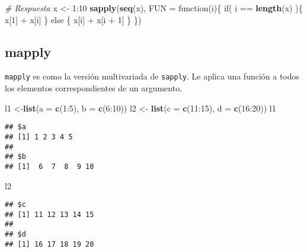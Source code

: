 \documentclass[]{article}
\newenvironment{Shaded}{\begin{snugshade}}{\end{snugshade}}
\newcommand{\KeywordTok}[1]{\textcolor[rgb]{0.13,0.29,0.53}{\textbf{{#1}}}}
\newcommand{\DataTypeTok}[1]{\textcolor[rgb]{0.13,0.29,0.53}{{#1}}}
\newcommand{\DecValTok}[1]{\textcolor[rgb]{0.00,0.00,0.81}{{#1}}}
\newcommand{\StringTok}[1]{\textcolor[rgb]{0.31,0.60,0.02}{{#1}}}
\newcommand{\CommentTok}[1]{\textcolor[rgb]{0.56,0.35,0.01}{\textit{{#1}}}}
\newcommand{\NormalTok}[1]{{#1}}
\begin{document}
\begin{Shaded}
\begin{Highlighting}[]
\CommentTok{# Respuesta}
\NormalTok{x <-}\StringTok{ }\DecValTok{1}\NormalTok{:}\DecValTok{10}
\KeywordTok{sapply}\NormalTok{(}\KeywordTok{seq}\NormalTok{(x), }\DataTypeTok{FUN =} \NormalTok{function(i)\{}
  \NormalTok{if( i ==}\StringTok{ }\KeywordTok{length}\NormalTok{(x) )\{}
    \NormalTok{x[}\DecValTok{1}\NormalTok{] +}\StringTok{ }\NormalTok{x[i]}
  \NormalTok{\} else \{}
    \NormalTok{x[i] +}\StringTok{ }\NormalTok{x[i +}\StringTok{ }\DecValTok{1}\NormalTok{]}
  \NormalTok{\}}
\NormalTok{\})}
\end{Highlighting}
\end{Shaded}

\subsection{mapply}\label{mapply}

\texttt{mapply} es como la versión multivariada de \texttt{sapply}. Le
aplica una función a todos los elementos correspondientes de un
argumento.

\begin{Shaded}
\begin{Highlighting}[]
\NormalTok{l1 <-}\KeywordTok{list}\NormalTok{(}\DataTypeTok{a =} \KeywordTok{c}\NormalTok{(}\DecValTok{1}\NormalTok{:}\DecValTok{5}\NormalTok{), }\DataTypeTok{b =} \KeywordTok{c}\NormalTok{(}\DecValTok{6}\NormalTok{:}\DecValTok{10}\NormalTok{))}
\NormalTok{l2 <-}\StringTok{ }\KeywordTok{list}\NormalTok{(}\DataTypeTok{c =} \KeywordTok{c}\NormalTok{(}\DecValTok{11}\NormalTok{:}\DecValTok{15}\NormalTok{), }\DataTypeTok{d =} \KeywordTok{c}\NormalTok{(}\DecValTok{16}\NormalTok{:}\DecValTok{20}\NormalTok{))}
\NormalTok{l1}
\end{Highlighting}
\end{Shaded}

\begin{verbatim}
## $a
## [1] 1 2 3 4 5
## 
## $b
## [1]  6  7  8  9 10
\end{verbatim}

\begin{Shaded}
\begin{Highlighting}[]
\NormalTok{l2}
\end{Highlighting}
\end{Shaded}

\begin{verbatim}
## $c
## [1] 11 12 13 14 15
## 
## $d
## [1] 16 17 18 19 20
\end{verbatim}
\end{document}
